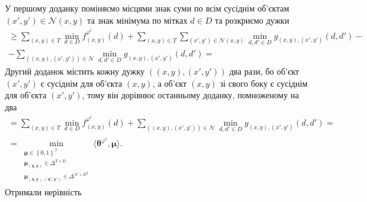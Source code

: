 У першому доданку поміняємо місцями знак суми по всім сусіднім об'єктам
$\left(x', y' \right) \in \mathcal{N} \left(x, y \right)$
та знак мінімума по мітках $d \in D$ та розкриємо дужки
\begin{equation*}
\begin{gathered}
    \ge \sum \limits_{\left(x, y \right) \in T}
        \min \limits_{d \in D}
            f_{\left(x, y \right)}^{\varphi^i} \left( d \right) +
    \sum \limits_{\left(x, y \right) \in T}
        \sum \limits_{\left(x', y' \right) \in \mathcal{N} \left(x, y \right)}
            \min \limits_{d, d' \in D}
                g_{\left(x, y \right), \left(x', y' \right)}
                    \left( d, d' \right) - \\
    - \sum \limits_{\left(\left(x, y \right), \left(x', y' \right) \right) \in \mathcal{N}}
        \min \limits_{d, d' \in D}
            g_{\left(x, y \right), \left(x', y' \right)} \left( d, d' \right) =
\end{gathered}
\end{equation*}
Другий доданок містить кожну дужку
$\left( \left(x, y \right), \left(x', y' \right) \right)$ два рази,
бо об'єкт $\left(x', y' \right)$ є сусіднім для об'єкта $\left(x, y \right)$,
а об'єкт $\left(x, y \right)$ зі свого боку є сусіднім для об'єкта
$\left(x', y' \right)$, тому він дорівнює останньому доданку, помноженому на два
\begin{equation*}
\begin{gathered}
    = \sum \limits_{\left(x, y \right) \in T}
        \min \limits_{d \in D}
            f_{\left(x, y \right)}^{\varphi^i} \left( d \right) +
    \sum \limits_{\left(\left(x, y \right), \left(x', y' \right) \right) \in \mathcal{N}}
        \min \limits_{d, d' \in D}
            g_{\left(x, y \right), \left(x', y' \right)} \left( d, d' \right) = \\
    = \min \limits_{\substack{\pmb{\mu} \in \left\{ 0, 1 \right\}^{\mathcal{I}} \\
                            \pmb{\mu_{\left(x, y \right)}} \in \Delta^{T \times D} \\
                            \pmb{\mu_{\left(x, y \right), \left(x', y' \right)}} \in
                                \Delta^{\mathcal{N} \times D^2}}}
        \langle \pmb{\theta}^{\varphi^i}, \pmb{\mu} \rangle.
\end{gathered}
\end{equation*}
Отримали нерівність
